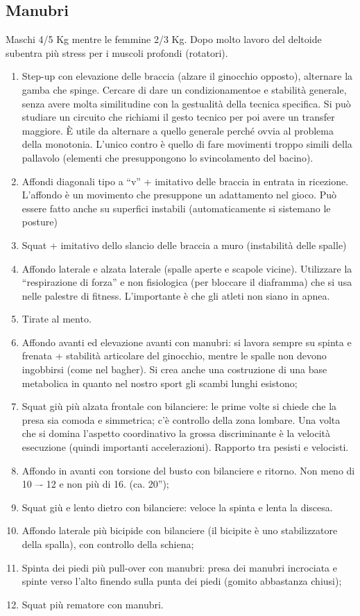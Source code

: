 \subsection{Manubri}
Maschi 4/5 Kg mentre le femmine 2/3 Kg. Dopo molto lavoro del deltoide subentra più stress per i muscoli profondi (rotatori).
\begin{enumerate}
\item Step-up con elevazione delle braccia (alzare il ginocchio opposto), alternare la gamba che spinge.
Cercare di dare un condizionamentoe e stabilità generale, senza avere molta similitudine con la
gestualità della tecnica specifica. Si può studiare un circuito che richiami il gesto tecnico per poi
avere un transfer maggiore. \`E utile da alternare a quello generale perché ovvia al problema della
monotonia. L'unico contro è quello di fare movimenti troppo simili della pallavolo (elementi che
presuppongono lo svincolamento del bacino).
\item Affondi diagonali tipo a “v” + imitativo delle braccia in entrata in ricezione. L'affondo
è un movimento che presuppone un adattamento nel gioco. Può essere fatto anche su superfici
instabili (automaticamente si sistemano le posture)
\item Squat + imitativo dello slancio delle braccia a muro (instabilità delle spalle)
\item Affondo laterale e alzata laterale (spalle aperte e scapole vicine). Utilizzare la “respirazione
di forza” e non fisiologica (per bloccare il diaframma) che si usa nelle palestre di fitness.
L'importante è che gli atleti non siano in apnea.
\item Tirate al mento.
\item Affondo avanti ed elevazione avanti con manubri: si lavora sempre su spinta e frenata +
stabilità articolare del ginocchio, mentre le spalle non devono ingobbirsi (come nel bagher). Si crea
anche una costruzione di una base metabolica in quanto nel nostro sport gli scambi lunghi esistono;
\item Squat giù più alzata frontale con bilanciere: le prime volte si chiede che la presa sia comoda
e simmetrica; c'è controllo della zona lombare. Una volta che si domina l'aspetto coordinativo la
grossa discriminante è la velocità esecuzione (quindi importanti accelerazioni). Rapporto tra pesisti
e velocisti.
\item Affondo in avanti con torsione del busto con bilanciere e ritorno. Non meno di 10 –- 12 e
non più di 16. (ca. 20'');
\item Squat giù e lento dietro con bilanciere: veloce la spinta e lenta la discesa.
\item Affondo laterale più bicipide con bilanciere (il bicipite è uno stabilizzatore della spalla), con
controllo della schiena;
\item Spinta dei piedi più pull-over con manubri: presa dei manubri incrociata e spinte verso l'alto
finendo sulla punta dei piedi (gomito abbastanza chiusi);
\item Squat più rematore con manubri.
\end{enumerate}


